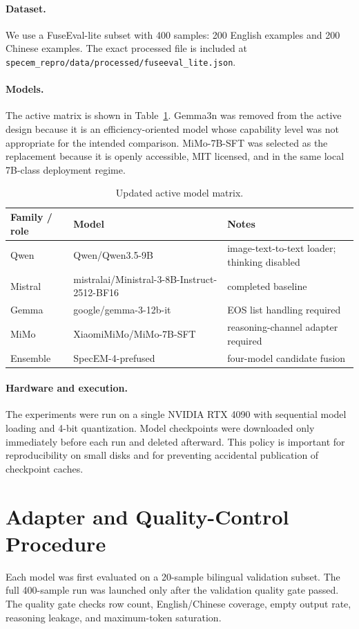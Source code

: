 \documentclass[11pt]{article}
\begin{document}
\paragraph{Dataset.} We use a FuseEval-lite subset with 400 samples: 200 English examples and 200 Chinese examples. The exact processed file is included at \texttt{specem\_repro/data/processed/fuseeval\_lite.json}.

\paragraph{Models.} The active matrix is shown in Table~\ref{tab:models}. Gemma3n was removed from the active design because it is an efficiency-oriented model whose capability level was not appropriate for the intended comparison. MiMo-7B-SFT was selected as the replacement because it is openly accessible, MIT licensed, and in the same local 7B-class deployment regime.

\begin{table}[h]
\centering
\begin{tabular}{lll}
\toprule
Family / role & Model & Notes \\
\midrule
Qwen & Qwen/Qwen3.5-9B & image-text-to-text loader; thinking disabled \\
Mistral & mistralai/Ministral-3-8B-Instruct-2512-BF16 & completed baseline \\
Gemma & google/gemma-3-12b-it & EOS list handling required \\
MiMo & XiaomiMiMo/MiMo-7B-SFT & reasoning-channel adapter required \\
Ensemble & SpecEM-4-prefused & four-model candidate fusion \\
\bottomrule
\end{tabular}
\caption{Updated active model matrix.}
\label{tab:models}
\end{table}

\paragraph{Hardware and execution.} The experiments were run on a single NVIDIA RTX 4090 with sequential model loading and 4-bit quantization. Model checkpoints were downloaded only immediately before each run and deleted afterward. This policy is important for reproducibility on small disks and for preventing accidental publication of checkpoint caches.

\section{Adapter and Quality-Control Procedure}
Each model was first evaluated on a 20-sample bilingual validation subset. The full 400-sample run was launched only after the validation quality gate passed. The quality gate checks row count, English/Chinese coverage, empty output rate, reasoning leakage, and maximum-token saturation.
\end{document}
